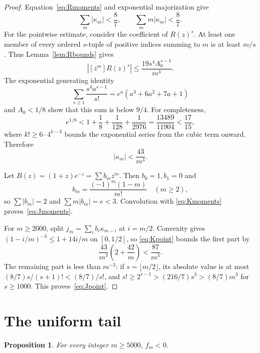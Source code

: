 \documentclass[11pt]{amsart}
\newtheorem{proposition}[theorem]{Proposition}
\theoremstyle{remark}
\begin{document}
\begin{proof}
Equation~\eqref{eq:Rmoments} and exponential majorization give
\begin{equation}\label{eq:Kmoments}
 \sum_m|\kappa_m|<\frac87,
 \qquad
 \sum_m m|\kappa_m|<\frac87.
\end{equation}
For the pointwise estimate, consider the coefficient of \(R(z)^s\). At
least one member of every ordered \(s\)-tuple of positive indices summing to
\(m\) is at least \(m/s\). Thus Lemma~\ref{lem:Rbounds} gives
\[
 |[z^m]R(z)^s|\le\frac{19s^4A_0^{s-1}}{m^3}.
\]
The exponential generating identity
\[
 \sum_{s\ge1}\frac{s^4a^{s-1}}{s!}
 =e^a(a^3+6a^2+7a+1)
\]
and \(A_0<1/8\) show that this sum is below \(9/4\). For completeness,
\[
 e^{1/8}<1+\frac18+\frac1{128}+\frac1{2976}
 =\frac{13489}{11904}<\frac{17}{15},
\]
where \(k!\ge6\cdot4^{k-3}\) bounds the exponential series from the cubic
term onward. Therefore
\begin{equation}\label{eq:Kpoint}
 |\kappa_m|<\frac{43}{m^3}.
\end{equation}

Let \(B(z)=(1+z)e^{-z}=\sum b_mz^m\). Then \(b_0=1,b_1=0\) and
\[
 b_m=\frac{(-1)^m(1-m)}{m!}\quad(m\ge2),
\]
so \(\sum|b_m|=2\) and \(\sum m|b_m|=e<3\). Convolution with
\eqref{eq:Kmoments} proves~\eqref{eq:Jmoments}.

For \(m\ge2000\), split \(j_m=\sum_i b_i\kappa_{m-i}\) at \(i=m/2\).
Convexity gives \((1-i/m)^{-3}\le1+14i/m\) on \([0,1/2]\), so
\eqref{eq:Kpoint} bounds the first part by
\[
 \frac{43}{m^3}\left(2+\frac{42}{m}\right)<\frac{87}{m^3}.
\]
The remaining part is less than \(m^{-3}\): if
\(s=\lfloor m/2\rfloor\), its absolute value is at most
\((8/7)s/(s+1)!<(8/7)/s!\), and
\(s!\ge2^{s-1}>(216/7)s^3> (8/7)m^3\) for \(s\ge1000\).
This proves~\eqref{eq:Jpoint}.
\end{proof}

\section{The uniform tail}

\begin{proposition}\label{prop:tail}
For every integer \(m\ge5000\), \(f_m<0\).
\end{proposition}
\end{document}
